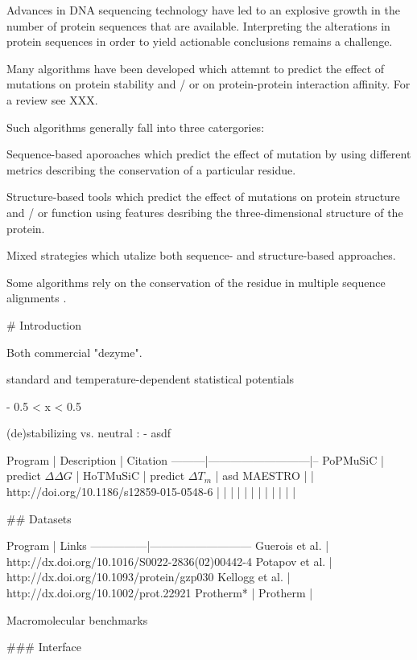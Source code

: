 

Advances in DNA sequencing technology have led to an explosive growth in the number of protein sequences that are available. Interpreting the alterations in protein sequences in order to yield actionable conclusions remains a challenge.

Many algorithms have been developed which attemnt to predict the effect of mutations on protein stability and / or on protein-protein interaction affinity. For a review see XXX.

Such algorithms generally fall into three catergories:

Sequence-based aporoaches which predict the effect of mutation by using different metrics describing the conservation of a particular residue.

Structure-based tools which predict the effect of mutations on protein structure and / or function using features desribing the three-dimensional structure of the protein.

Mixed strategies which utalize both sequence- and structure-based approaches.

Some algorithms rely on the conservation of the residue in multiple sequence alignments .


# Introduction


Both commercial "dezyme".

standard and temperature-dependent statistical potentials

- 0.5 < x < 0.5


(de)stabilizing vs. neutral
: - asdf



Program  | Description               |  Citation
---------|---------------------------|--
PoPMuSiC | predict $\Delta \Delta G$ |
HoTMuSiC | predict $\Delta T_{m}$    | asd
MAESTRO  |   | http://doi.org/10.1186/s12859-015-0548-6
  |   |
  |   |
  |   |
  |   |
  |   |
  |   |



## Datasets

Program        | Links
---------------|---------------------------
Guerois et al. | http://dx.doi.org/10.1016/S0022-2836(02)00442-4
Potapov et al. | http://dx.doi.org/10.1093/protein/gzp030
Kellogg et al. | http://dx.doi.org/10.1002/prot.22921
Protherm*      |
Protherm       |

Macromolecular benchmarks


### Interface

